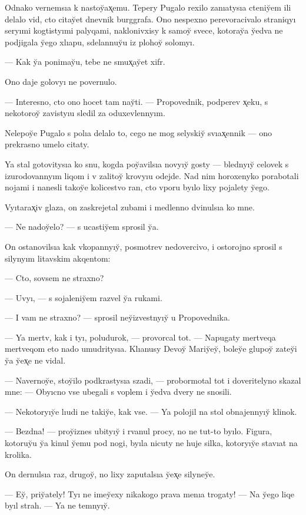 \documentclass[10pt]{book}
\begin{document}
Odnako vernemsıa k nastoy̆ax̨emu. Tepery Pugalo rexilo zanıatysıa cteniy̆em ili delalo vid, cto citay̆et dnevnik burggrafa. Ono nespexno perevoracivalo straniqyı seryımi kogtistyımi palyqami, naklonivxisy k samoy̆ svece, kotoray̆a y̆edva ne podjigala y̆ego xlıapu, sdelannuy̆u iz plohoy̆ solomyı.

— Kak y̆a ponimay̆u, tebe ne smux̨ay̆et xifr.

Ono daje golovyı ne povernulo.

— Interesno, cto ono hocet tam nay̆ti. — Propovednik, podperev x̨eku, s nekotoroy̆ zavistyıu sledil za oduxevlennyım.

Nelepoy̆e Pugalo s polıa delalo to, cego ne mog selyskiy̆ svıax̨ennik — ono prekrasno umelo citaty.

Ya stal gotovitysıa ko snu, kogda poy̆avilsıa novyıy̆ gosty — blednyıy̆ celovek s izurodovannyım liqom i v zalitoy̆ krovyıu odejde. Nad nim horoxenyko porabotali nojami i nanesli takoy̆e kolicestvo ran, cto vporu byılo lixy pojalety y̆ego.

Vyıtarax̨iv glaza, on zaskrejetal zubami i medlenno dvinulsıa ko mne.

— Ne nadoy̆elo? — s ucastiy̆em sprosil y̆a.

On ostanovilsıa kak vkopannyıy̆, posmotrev nedovercivo, i ostorojno sprosil s silynyım litavskim akqentom:

— Cto, sovsem ne straxno?

— Uvyı, — s sojaleniy̆em razvel y̆a rukami.

— I vam ne straxno? — sprosil ney̆izvestnyıy̆ u Propovednika.

— Ya mertv, kak i tyı, poludurok, — provorcal tot. — Napugaty mertveqa mertveqom eto nado umudritysıa. Klıanusy Devoy̆ Mariy̆ey̆, boley̆e glupoy̆ zatey̆i y̆a y̆ex̨e ne vidal.

— Navernoy̆e, stoy̆ilo podkrastysıa szadi, — probormotal tot i doveritelyno skazal mne: — Obyıcno vse ubegali s voplem i y̆edva dvery ne snosili.

— Nekotoryıy̆e lıudi ne takiy̆e, kak vse. — Ya polojil na stol obnajennyıy̆ klinok.

— Bezdna! — proy̆iznes ubityıy̆ i rvanul procy, no ne tut-to byılo. Figura, kotoruy̆u y̆a kinul y̆emu pod nogi, byıla nicuty ne huje silka, kotoryıy̆e stavıat na krolika.

On dernulsıa raz, drugoy̆, no lixy zaputalsıa y̆ex̨e silyney̆e.

— Ey̆, priy̆ately! Tyı ne imey̆exy nikakogo prava menıa trogaty! — Na y̆ego liqe byıl strah. — Ya ne temnyıy̆.
\end{document}
